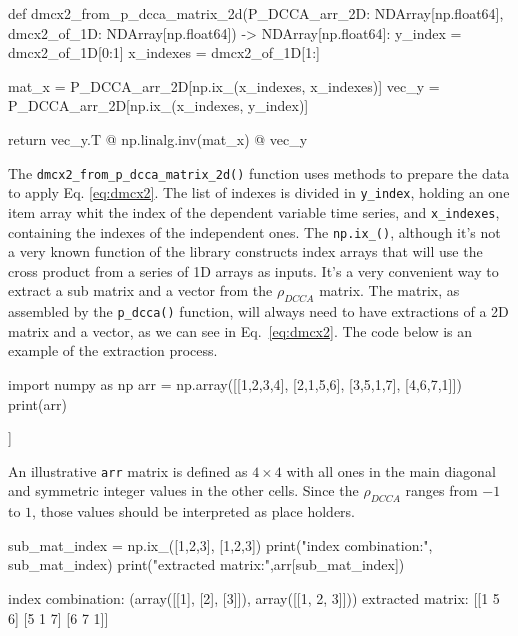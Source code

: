 \documentclass[article]{jss}
\begin{document}
\begin{Code}
def dmcx2_from_p_dcca_matrix_2d(P_DCCA_arr_2D: NDArray[np.float64], 
          dmcx2_of_1D: NDArray[np.float64]) -> NDArray[np.float64]:   
  y_index = dmcx2_of_1D[0:1]
  x_indexes = dmcx2_of_1D[1:]

  mat_x = P_DCCA_arr_2D[np.ix_(x_indexes, x_indexes)]
  vec_y = P_DCCA_arr_2D[np.ix_(x_indexes, y_index)]

  return vec_y.T @ np.linalg.inv(mat_x) @ vec_y
\end{Code}

The \verb"dmcx2_from_p_dcca_matrix_2d()" function uses  methods to prepare the data to apply Eq. \ref{eq:dmcx2}. The list of indexes is divided in \verb"y_index", holding an one item array whit the index of the dependent variable time series, and \verb"x_indexes", containing the indexes of the independent ones. The  \verb"np.ix_()", although  it's not a very known function of the library constructs index arrays that will use the cross product from a series of 1D arrays as inputs. It's a very convenient way to extract a sub matrix and a vector from the $\rho_{DCCA}$ matrix. The matrix, as assembled by the \verb"p_dcca()" function, will always need to have extractions of a 2D matrix and a vector, as we can see in Eq.~\ref{eq:dmcx2}. The code below is an example of the extraction process.

\begin{CodeChunk}
\begin{CodeInput}
import numpy as np
arr = np.array([[1,2,3,4],
                [2,1,5,6],
                [3,5,1,7],
                [4,6,7,1]])
print(arr)
\end{CodeInput}

\begin{CodeOutput}
[[1 2 3 4]
 [2 1 5 6]
 [3 5 1 7]
 [4 6 7 1]]
\end{CodeOutput}
\end{CodeChunk}
An illustrative \verb"arr" matrix is defined as $4 \times 4$ with all ones in the main diagonal and symmetric integer values in the other cells. Since the $\rho_{DCCA}$ ranges from $-1$ to $1$, those values should be interpreted as place holders. 
\begin{CodeChunk}
\begin{CodeInput}
sub_mat_index = np.ix_([1,2,3], [1,2,3])
print("index combination:\n", sub_mat_index)
print("extracted matrix:\n",arr[sub_mat_index])
\end{CodeInput}

\begin{CodeOutput}
index combination:
(array([[1],
      [2],
      [3]]), array([[1, 2, 3]]))
extracted matrix:
[[1 5 6]
[5 1 7]
[6 7 1]]
\end{CodeOutput}
\end{CodeChunk}
\end{document}
